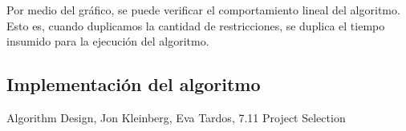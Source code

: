 Por medio del gráfico, se puede verificar el comportamiento lineal del algoritmo.
Esto es, cuando duplicamos la cantidad de restricciones, se duplica el tiempo insumido para la ejecución del algoritmo.

\newpage

\subsection{Implementación del algoritmo}











\newpage
\renewcommand\refname{Referencias}
\begin{thebibliography}{X}
 Algorithm Design, Jon Kleinberg, Eva Tardos, 7.11 Project Selection
\end{thebibliography}
\newpage

